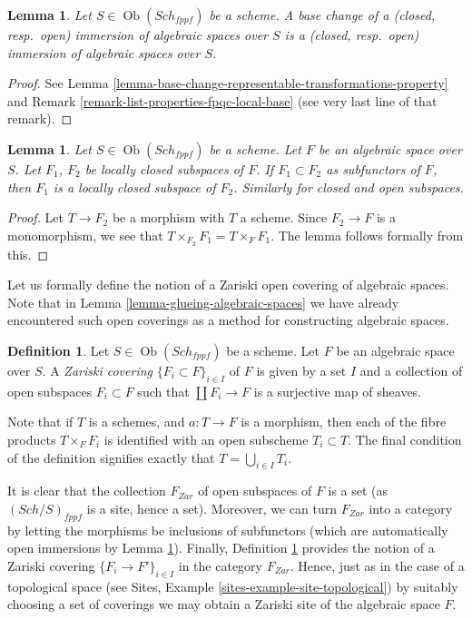 \documentclass{stacks-project}
\theoremstyle{plain}
\newtheorem{lemma}[subsection]{Lemma}
\theoremstyle{definition}
\newtheorem{definition}[subsection]{Definition}
\theoremstyle{remark}
\numberwithin{equation}{subsection}
\def\Sch{\mathit{Sch}}
\def\Ob{\mathop{\mathrm{Ob}}\nolimits}
\begin{document}
\begin{lemma}
\label{lemma-base-change-immersions}
Let $S \in \Ob(\Sch_{fppf})$ be a scheme.
A base change of a (closed, resp.\ open) immersion
of algebraic spaces over $S$ is a (closed, resp.\ open)
immersion of algebraic spaces over $S$.
\end{lemma}

\begin{proof}
See Lemma \ref{lemma-base-change-representable-transformations-property} and
Remark \ref{remark-list-properties-fpqc-local-base} (see very last line of
that remark).
\end{proof}

\begin{lemma}
\label{lemma-sub-subspaces}
Let $S \in \Ob(\Sch_{fppf})$ be a scheme.
Let $F$ be an algebraic space over $S$. Let $F_1$, $F_2$ be
locally closed subspaces of $F$. If $F_1 \subset F_2$ as subfunctors
of $F$, then $F_1$ is a locally closed subspace of $F_2$.
Similarly for closed and open subspaces.
\end{lemma}

\begin{proof}
Let $T \to F_2$ be a morphism with $T$ a scheme.
Since $F_2 \to F$ is a monomorphism, we see that
$T \times_{F_2} F_1 = T \times_F F_1$. The lemma follows
formally from this.
\end{proof}

\noindent
Let us formally define the notion of a Zariski open covering of
algebraic spaces. Note that in Lemma \ref{lemma-glueing-algebraic-spaces}
we have already encountered such open coverings as a method for
constructing algebraic spaces.

\begin{definition}
\label{definition-Zariski-open-covering}
Let $S \in \Ob(\Sch_{fppf})$ be a scheme.
Let $F$ be an algebraic space over $S$.
A {\it Zariski covering} $\{F_i \subset F\}_{i \in I}$ of $F$
is given by a set $I$ and a collection of open subspaces
$F_i \subset F$ such that $\coprod F_i \to F$ is a surjective
map of sheaves.
\end{definition}

\noindent
Note that if $T$ is a schemes,
and $a : T \to F$ is a morphism, then each of the fibre products
$T \times_F F_i$ is identified with an open subscheme
$T_i \subset T$. The final condition of the definition signifies
exactly that $T = \bigcup_{i \in I} T_i$.

\medskip\noindent
It is clear that the collection $F_{Zar}$ of open subspaces of
$F$ is a set (as $(\Sch/S)_{fppf}$ is a site, hence a set).
Moreover, we can turn $F_{Zar}$ into a category by letting the
morphisms be inclusions of subfunctors (which are automatically open
immersions by Lemma \ref{lemma-sub-subspaces}). Finally,
Definition \ref{definition-Zariski-open-covering}
provides the notion of a Zariski covering $\{F_i \to F'\}_{i \in I}$
in the category $F_{Zar}$. Hence, just as in the case of a topological
space (see Sites, Example \ref{sites-example-site-topological})
by suitably choosing a set of coverings
we may obtain a Zariski site of the algebraic space $F$.
\end{document}

